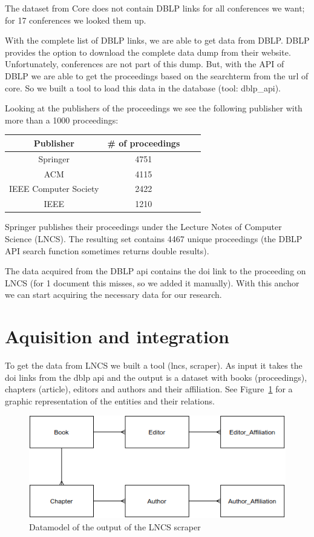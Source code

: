 \documentclass{ou-report}
\begin{document}
The dataset from Core does not contain DBLP links for all conferences we want; 
for 17 conferences we looked them up.

With the complete list of DBLP links, we are able to get data from DBLP. DBLP
provides the option to download the complete data dump from their website. 
Unfortunately, conferences are not part of this dump. But, with the API of DBLP
we are able to get the proceedings based on the searchterm from the url of core.
So we built a tool to load this data in the database (tool: dblp\_api).

Looking at the publishers of the proceedings we see the following publisher with 
more than a 1000 proceedings:
\begin{center}
    \begin{tabular}{ |c|c|c|c| }
        \hline
        Publisher & \# of proceedings \\
        \hline
        Springer & 4751 \\
        ACM & 4115 \\
        IEEE Computer Society & 2422 \\
        IEEE & 1210 \\
        \hline
    \end{tabular}
\end{center}
Springer publishes their proceedings under the Lecture Notes of Computer Science 
(LNCS). The resulting set contains 4467 unique proceedings (the DBLP API search
function sometimes returns double results).

The data acquired from the DBLP api contains the doi link to the proceeding on 
LNCS (for 1 document this misses, so we added it manually). With this anchor we 
can start acquiring the necessary data for our research.

\section{Aquisition and integration}
To get the data from LNCS we built a tool (lncs, scraper). As input it takes the
doi links from the dblp api and the output is a dataset with books 
(proceedings), chapters (article), editors and authors and their affiliation. 
See Figure~\ref{fig:lncs_scraper_datamodel} for a graphic representation of the 
entities and their relations.

\begin{figure}[H]
    \centering
    \includegraphics[width=12cm]{images/lncs_scraper_datamodel.drawio.png}
    \caption{Datamodel of the output of the LNCS scraper}
    \label{fig:lncs_scraper_datamodel}
\end{figure}
\end{document}
